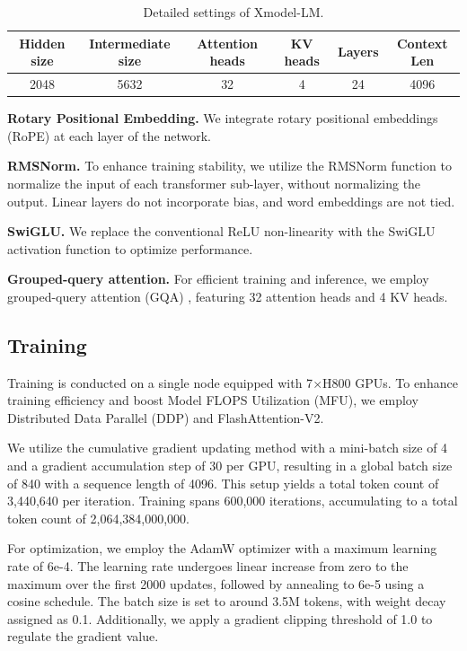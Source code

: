 \documentclass{article}
\newcommand{\llm}{Xmodel-LM\xspace}
\begin{document}
\begin{table}[ht]
  \centering
  \setlength{\tabcolsep}{6pt}
  \begin{tabular}{@{}cccccc@{}}
    \toprule
    Hidden size & Intermediate size & Attention heads &  KV heads & Layers & Context Len\\
    \midrule
    2048 & 5632 & 32 & 4 & 24 & 4096\\
    \bottomrule
  \end{tabular}
  \newline
  \caption{Detailed settings of \llm.}
  \label{tab: LLM_setting}
\end{table}

\noindent\textbf{Rotary Positional Embedding.} We integrate rotary positional embeddings (RoPE) \citep{su2023roformer} at each layer of the network.

\noindent\textbf{RMSNorm.} To enhance training stability, we utilize the RMSNorm \citep{Zhang2019RMSNorm} function to normalize the input of each transformer sub-layer, without normalizing the output. Linear layers do not incorporate bias, and word embeddings are not tied.

\noindent\textbf{SwiGLU.} We replace the conventional ReLU non-linearity with the SwiGLU \citep{shazeer2020glu} activation function to optimize performance.

\noindent\textbf{Grouped-query attention.} For efficient training and inference, we employ grouped-query attention (GQA) \citep{ainslie2023gqa}, featuring 32 attention heads and 4 KV heads.

\subsection{Training}

Training is conducted on a single node equipped with 7$\times$H800 GPUs. To enhance training efficiency and boost Model FLOPS Utilization (MFU), we employ Distributed Data Parallel (DDP) and FlashAttention-V2.

We utilize the cumulative gradient updating method with a mini-batch size of 4 and a gradient accumulation step of 30 per GPU, resulting in a global batch size of 840 with a sequence length of 4096. This setup yields a total token count of 3,440,640 per iteration. Training spans 600,000 iterations, accumulating to a total token count of 2,064,384,000,000.

For optimization, we employ the AdamW optimizer with a maximum learning rate of 6e-4. The learning rate undergoes linear increase from zero to the maximum over the first 2000 updates, followed by annealing to 6e-5 using a cosine schedule. The batch size is set to around 3.5M tokens, with weight decay assigned as 0.1. Additionally, we apply a gradient clipping threshold of 1.0 to regulate the gradient value.
\end{document}
